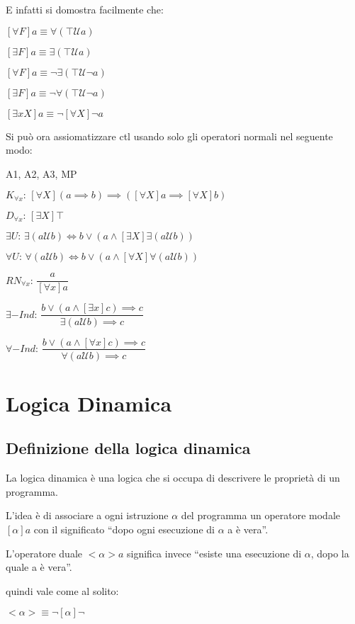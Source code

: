 E infatti si domostra facilmente che:

$[\forall F]a\equiv\forall(\top\mathcal{U}a)$

$[\exists F]a\equiv\exists(\top\mathcal{U}a)$

$[\forall F]a\equiv\neg\exists(\top\mathcal{U\neg}a)$

$[\exists F]a\equiv\neg\forall(\top\mathcal{U\neg}a)$

$[\exists xX]a\equiv\neg[\forall X]\neg a$

Si può ora assiomatizzare ctl usando solo gli operatori normali nel
seguente modo:

A1, A2, A3, MP

$K_{\forall x}:\,[\forall X](a\implies b)\implies([\forall X]a\implies[\forall X]b)$

$D_{\forall x}:\,[\exists X]\top$

$\exists U:\,\exists(a\mathcal{U}b)\iff b\vee(a\wedge[\exists X]\exists(a\mathcal{U}b))$

$\forall U:\,\forall(a\mathcal{U}b)\iff b\vee(a\wedge[\forall X]\forall(a\mathcal{U}b))$

$RN_{\forall x}:\,\dfrac{a}{[\forall x]a}$

$\exists-Ind:\,\dfrac{b\vee(a\wedge[\exists x]c)\implies c}{\exists(a\mathcal{U}b)\implies c}$

$\forall-Ind:\,\dfrac{b\vee(a\wedge[\forall x]c)\implies c}{\forall(a\mathcal{U}b)\implies c}$


\section{Logica Dinamica}


\subsection{Definizione della logica dinamica}

La logica dinamica è una logica che si occupa di descrivere le proprietà
di un programma.

L'idea è di associare a ogni istruzione $\alpha$ del programma un
operatore modale $[\alpha]a$ con il significato ``dopo ogni esecuzione
di $\alpha$ a è vera''.

L'operatore duale $<\alpha>a$ significa invece ``esiste una esecuzione
di $\alpha$, dopo la quale a è vera''.

quindi vale come al solito:

$<\alpha>\equiv\neg[\alpha]\neg$

